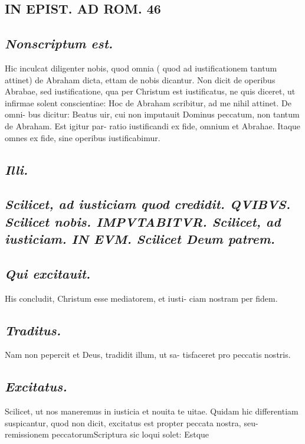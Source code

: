 \documentclass{article}
\begin{document}
\begin{pages}
\section*{IN EPIST. AD ROM.  46 }
\marginpar{[ p.]}
{}
\subsection*{\textit{Nonscriptum est. }}\pstart Hic inculcat diligenter nobis, quod omnia ( quod ad iustificationem tantum attinet) de Abraham dicta, ettam de nobis dicantur. Non dicit de operibus Abrabae, sed iustificatione, qua per Christum est iustificatus, ne quis diceret, ut infirmae solent conscientiae: Hoc de Abraham scribitur, ad me nihil attinet. De omni- bus dicitur: Beatus uir, cui non imputauit Dominus peccatum, non tantum de Abraham. Est igitur par- ratio iustificandi ex fide, omnium et Abrahae. Itaque  omnes ex fide, sine operibus iustificabimur.   \pend
{}
{}
\subsection*{\textit{Illi. }}
{}
\subsection*{\textit{Scilicet, ad iusticiam quod credidit. QVIBVS.  Scilicet nobis. IMPVTABITVR. Scilicet, ad iusticiam. IN EVM. Scilicet Deum patrem.  }}
{}
\subsection*{\textit{Qui excitauit. }}\pstart His concludit, Christum esse mediatorem, et iusti- ciam nostram per fidem.   \pend
{}
{}
\subsection*{\textit{Traditus. }}\pstart Nam non pepercit et Deus, tradidit illum, ut sa- tisfaceret pro peccatis nostris.   \pend
{}
{}
\subsection*{\textit{Excitatus. }}\pstart Scilicet, ut nos maneremus in iusticia et nouita te uitae. Quidam hic differentiam suspicantur, quod non dicit, excitatus est propter peccata nostra, seu- remissionem peccatorumScriptura sic loqui solet: Estque   \pend\pstart  \pend

\end{pages}
\end{document}

